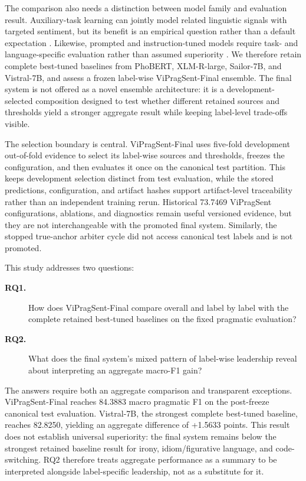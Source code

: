 The comparison also needs a distinction between model family and evaluation result. Auxiliary-task learning can jointly model related linguistic signals with targeted sentiment, but its benefit is an empirical question rather than a default expectation \citep{moore-barnes-2021-multi}. Likewise, prompted and instruction-tuned models require task- and language-specific evaluation rather than assumed superiority \citep{toukmaji-flanigan-2025-adapting,dou-etal-2024-sailor}. We therefore retain complete best-tuned baselines from PhoBERT, XLM-R-large, Sailor-7B, and Vistral-7B, and assess a frozen label-wise ViPragSent-Final ensemble. The final system is not offered as a novel ensemble architecture: it is a development-selected composition designed to test whether different retained sources and thresholds yield a stronger aggregate result while keeping label-level trade-offs visible.

The selection boundary is central. ViPragSent-Final uses five-fold development out-of-fold evidence to select its label-wise sources and thresholds, freezes the configuration, and then evaluates it once on the canonical test partition. This keeps development selection distinct from test evaluation, while the stored predictions, configuration, and artifact hashes support artifact-level traceability rather than an independent training rerun. Historical 73.7469 ViPragSent configurations, ablations, and diagnostics remain useful versioned evidence, but they are not interchangeable with the promoted final system. Similarly, the stopped true-anchor arbiter cycle did not access canonical test labels and is not promoted.

This study addresses two questions:
\begin{description}
  \item[\textbf{RQ1.}] How does ViPragSent-Final compare overall and label by label with the complete retained best-tuned baselines on the fixed pragmatic evaluation?
  \item[\textbf{RQ2.}] What does the final system's mixed pattern of label-wise leadership reveal about interpreting an aggregate macro-F1 gain?
\end{description}

The answers require both an aggregate comparison and transparent exceptions. ViPragSent-Final reaches 84.3883 macro pragmatic F1 on the post-freeze canonical test evaluation. Vistral-7B, the strongest complete best-tuned baseline, reaches 82.8250, yielding an aggregate difference of +1.5633 points. This result does not establish universal superiority: the final system remains below the strongest retained baseline result for irony, idiom/figurative language, and code-switching. RQ2 therefore treats aggregate performance as a summary to be interpreted alongside label-specific leadership, not as a substitute for it.

